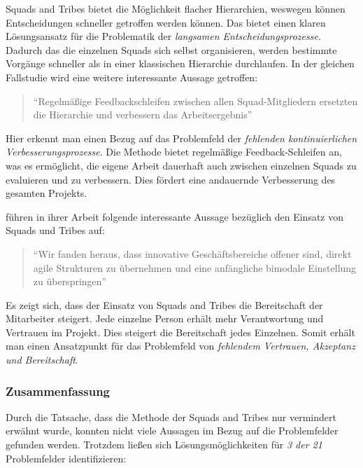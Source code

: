Squads and Tribes bietet die Möglichkeit flacher Hierarchien, weswegen können Entscheidungen schneller getroffen werden können. Das bietet einen klaren Lösungsansatz für die Problematik der \textit{langsamen Entscheidungsprozesse}. Dadurch das die einzelnen Squads sich selbst  organisieren, werden bestimmte Vorgänge schneller als in einer klassischen Hierarchie durchlaufen. In der gleichen Fallstudie wird eine weitere interessante  Aussage getroffen:

\begin{quote}
	``Regelmäßige Feedbackschleifen zwischen allen Squad-Mitgliedern ersetzten die Hierarchie und verbessern das Arbeitsergebnis'' \cite[S. 98]{heinemann_digitale_2016}
\end{quote}

Hier erkennt man einen Bezug auf das Problemfeld der \textit{fehlenden kontinuierlichen Verbesserungsprozesse}. Die Methode bietet regelmäßige Feedback-Schleifen an, was es ermöglicht, die eigene Arbeit dauerhaft auch zwischen einzelnen Squads zu evaluieren und zu verbessern. Dies fördert eine andauernde Verbesserung des gesamten Projekts.

 führen in ihrer Arbeit folgende interessante Aussage bezüglich den Einsatz von Squads und Tribes auf:

\begin{quote}
	``Wir fanden heraus, dass innovative Geschäftsbereiche offener sind, direkt agile Strukturen zu übernehmen und eine anfängliche bimodale Einstellung zu überspringen'' \cite[S. 9]{gerster_how_2019}
\end{quote}

Es zeigt sich, dass der Einsatz von Squads and Tribes die Bereitschaft der Mitarbeiter steigert. Jede einzelne Person erhält mehr Verantwortung und Vertrauen im Projekt. Dies steigert die Bereitschaft jedes Einzelnen. Somit erhält man einen Ansatzpunkt für das Problemfeld von \textit{fehlendem Vertrauen, Akzeptanz und Bereitschaft}.

\subsubsection{Zusammenfassung}

Durch die Tatsache, dass die Methode der Squads and Tribes nur vermindert erwähnt wurde, konnten nicht viele Aussagen im Bezug auf die Problemfelder gefunden werden. Trotzdem ließen sich Lösungsmöglichkeiten für \textit{3 der 21} Problemfelder identifizieren:

